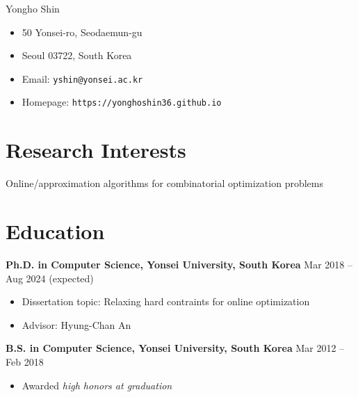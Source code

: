 \documentclass{cv}
\begin{document}
{\Huge Yongho Shin}
\begin{itemize}[itemsep=-3pt, leftmargin=0pt, label=]
\item 50 Yonsei-ro, Seodaemun-gu
\item Seoul 03722, South Korea
\item Email: \texttt{yshin@yonsei.ac.kr}
\item Homepage: \texttt{https://yonghoshin36.github.io}
\end{itemize}

\section{Research Interests}
Online/approximation algorithms for combinatorial optimization problems

\section{Education}
\textbf{Ph.D. in Computer Science, Yonsei University, South Korea} \hfill Mar 2018 -- Aug 2024 (expected)
\vspace{\killinitspace}
\begin{itemize}
\item Dissertation topic: Relaxing hard contraints for online optimization
\item Advisor: Hyung-Chan An
\end{itemize}

\textbf{B.S. in Computer Science, Yonsei University, South Korea} \hfill Mar 2012 -- Feb 2018
\vspace{\killinitspace}
\begin{itemize}
\item Awarded \textsl{high honors at graduation}
\end{itemize}

\end{document}
